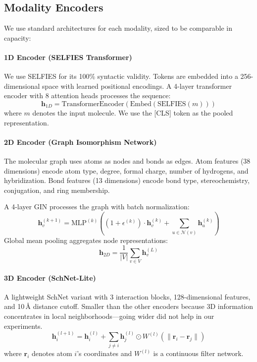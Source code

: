 \documentclass[11pt]{article}
\begin{document}
\subsection{Modality Encoders}

We use standard architectures for each modality, sized to be comparable in capacity:

\paragraph{1D Encoder (SELFIES Transformer)}
We use SELFIES \citep{krenn2020selfies} for its 100\% syntactic validity. Tokens are embedded into a 256-dimensional space with learned positional encodings. A 4-layer transformer encoder with 8 attention heads processes the sequence:
\begin{equation}
    \mathbf{h}_{1D} = \text{TransformerEncoder}(\text{Embed}(\text{SELFIES}(m)))
\end{equation}
where $m$ denotes the input molecule. We use the [CLS] token as the pooled representation.

\paragraph{2D Encoder (Graph Isomorphism Network)}
The molecular graph uses atoms as nodes and bonds as edges. Atom features (38 dimensions) encode atom type, degree, formal charge, number of hydrogens, and hybridization. Bond features (13 dimensions) encode bond type, stereochemistry, conjugation, and ring membership.

A 4-layer GIN \citep{xu2019powerful} processes the graph with batch normalization:
\begin{equation}
    \mathbf{h}_v^{(k+1)} = \text{MLP}^{(k)}\left((1 + \epsilon^{(k)}) \cdot \mathbf{h}_v^{(k)} + \sum_{u \in \mathcal{N}(v)} \mathbf{h}_u^{(k)}\right)
\end{equation}
Global mean pooling aggregates node representations:
\begin{equation}
    \mathbf{h}_{2D} = \frac{1}{|V|} \sum_{v \in V} \mathbf{h}_v^{(L)}
\end{equation}

\paragraph{3D Encoder (SchNet-Lite)}
A lightweight SchNet variant \citep{schutt2017schnet} with 3 interaction blocks, 128-dimensional features, and 10\,\AA{} distance cutoff. Smaller than the other encoders because 3D information concentrates in local neighborhoods---going wider did not help in our experiments.
\begin{equation}
    \mathbf{h}_i^{(l+1)} = \mathbf{h}_i^{(l)} + \sum_{j \neq i} \mathbf{h}_j^{(l)} \odot W^{(l)}(\|\mathbf{r}_i - \mathbf{r}_j\|)
\end{equation}
where $\mathbf{r}_i$ denotes atom $i$'s coordinates and $W^{(l)}$ is a continuous filter network.
\end{document}
